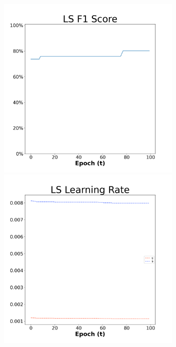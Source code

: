 \begin{figure}[H]
    \centering %
\begin{subfigure}{0.3\textwidth}
  \includegraphics[width=\linewidth]{images/exper2/Ionosphere/LS_0.01_f1.png}
    \includegraphics[width=\linewidth]{images/exper2/Ionosphere/LS_0.01_lr.png}

\end{subfigure}
\end{figure}

